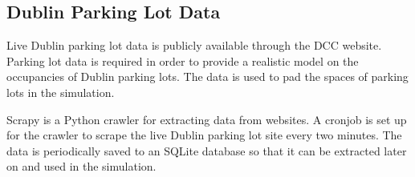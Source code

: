 \subsection{Dublin Parking Lot Data}\label{data:parking_lot}
Live Dublin parking lot data is publicly available through the DCC website. Parking lot data is required in order to provide a realistic model on the occupancies of Dublin parking lots. The data is used to pad the spaces of parking lots in the simulation.

Scrapy is a Python crawler for extracting data from websites. A cronjob is set up for the crawler to scrape the live Dublin parking lot site every two minutes. The data is periodically saved to an SQLite database so that it can be extracted later on and used in the simulation.